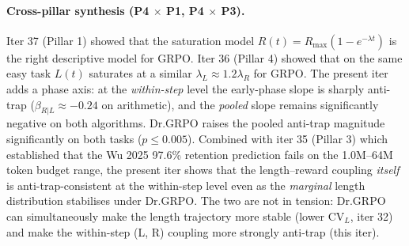 \begin{table}[t]
\centering
\small
\caption{Paired bootstrap GRPO$-$Dr.GRPO on the iter 40 metrics
(4000 resamples, paired over seeds).  Positive $\Delta$ means
Dr.GRPO lowers the metric.}
\label{tab:length-iter40-cross}
\end{table}

\paragraph{Cross-pillar synthesis (P4 $\times$ P1, P4 $\times$ P3).}
Iter 37 (Pillar 1) showed that the saturation model
$R(t) = R_{\max}(1 - e^{-\lambda t})$ is the right descriptive model
for GRPO.  Iter 36 (Pillar 4) showed that on the same easy task
$L(t)$ saturates at a similar $\lambda_L \approx 1.2 \lambda_R$ for
GRPO.  The present iter adds a phase axis: at the \emph{within-step}
level the early-phase slope is sharply anti-trap ($\beta_{R|L}
\approx -0.24$ on arithmetic), and the \emph{pooled} slope remains
significantly negative on both algorithms.  Dr.GRPO raises the
pooled anti-trap magnitude significantly on both tasks ($p \le 0.005$).
Combined with iter 35 (Pillar 3) which established that the Wu 2025
97.6\% retention prediction fails on the 1.0M--64M token budget
range, the present iter shows that the length--reward coupling
\emph{itself} is anti-trap-consistent at the within-step level even
as the \emph{marginal} length distribution stabilises under Dr.GRPO.
The two are not in tension: Dr.GRPO can simultaneously make the
length trajectory more stable (lower CV$_L$, iter 32) and make the
within-step (L, R) coupling more strongly anti-trap (this iter).

